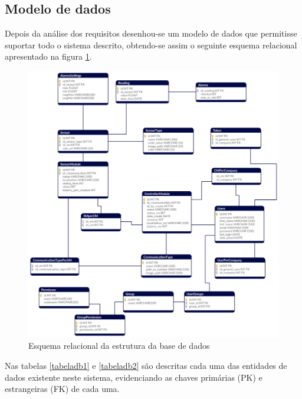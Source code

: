 \newpage
\subsection{Modelo de dados}
\label{modelocap}

Depois da análise dos requisitos desenhou-se um modelo de dados que permitisse suportar todo o sistema descrito, obtendo-se assim o seguinte esquema relacional apresentado na figura \ref{esquemarelacional}.





\begin{figure}[!htb]
	\centering
	\includegraphics[width=\linewidth]{esquemas/database_tese.pdf}
	\caption{Esquema relacional da estrutura da base de dados}
	\label{esquemarelacional}
\end{figure}


Nas tabelas \ref{tabeladb1} e \ref{tabeladb2} são descritas cada uma das entidades de dados existente neste sistema, evidenciando as chaves primárias (\ac{PK}) e estrangeiras (\ac{FK}) de cada uma. 



